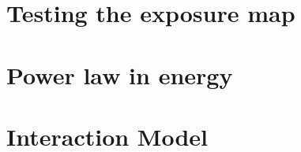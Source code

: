 \appendices


\chapter{Testing the exposure map}
\label{appendix:exposure}


\chapter{Power law in energy}
\label{appendix:pw_energy}


\chapter{Interaction Model}
\label{appendix:interaction_model}







